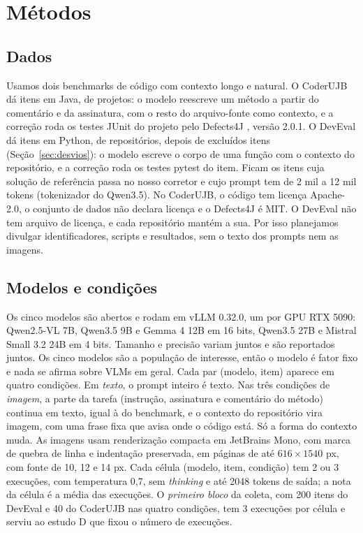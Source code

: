 \section{Métodos}

\subsection{Dados}
Usamos dois benchmarks de código com contexto longo e natural. O CoderUJB \citep{zeng2024coderujb} dá \nItemsUjb itens em Java, de \nClustersUjb projetos: o modelo reescreve um método a partir do comentário e da assinatura, com o resto do arquivo-fonte como contexto, e a correção roda os testes JUnit do projeto pelo Defects4J \citep{just2014defects4j}, versão 2.0.1. O DevEval \citep{li2024deveval} dá \nItemsDev itens em Python, de \nClustersDev repositórios, depois de excluídos \excludedDev itens (Seção~\ref{sec:desvios}): o modelo escreve o corpo de uma função com o contexto do repositório, e a correção roda os testes pytest do item. Ficam os itens cuja solução de referência passa no nosso corretor e cujo prompt tem de 2 mil a 12 mil tokens (tokenizador do Qwen3.5). No CoderUJB, o código tem licença Apache-2.0, o conjunto de dados não declara licença e o Defects4J é MIT. O DevEval não tem arquivo de licença, e cada repositório mantém a sua. Por isso planejamos divulgar identificadores, scripts e resultados, sem o texto dos prompts nem as imagens.

\subsection{Modelos e condições}
Os cinco modelos são abertos e rodam em vLLM \citep{kwon2023vllm} 0.32.0, um por GPU RTX 5090: Qwen2.5-VL 7B, Qwen3.5 9B e Gemma 4 12B em 16 bits, Qwen3.5 27B e Mistral Small 3.2 24B em 4 bits. Tamanho e precisão variam juntos e são reportados juntos. Os cinco modelos são a população de interesse, então o modelo é fator fixo e nada se afirma sobre VLMs em geral. Cada par (modelo, item) aparece em quatro condições. Em \emph{texto}, o prompt inteiro é texto. Nas três condições de \emph{imagem}, a parte da tarefa (instrução, assinatura e comentário do método) continua em texto, igual à do benchmark, e o contexto do repositório vira imagem, com uma frase fixa que avisa onde o código está. Só a forma do contexto muda. As imagens usam renderização compacta em JetBrains Mono, com marca de quebra de linha e indentação preservada, em páginas de até $616 \times 1540$ px, com fonte de 10, 12 e 14 px. Cada célula (modelo, item, condição) tem 2 ou 3 execuções, com temperatura 0,7, sem \emph{thinking} e até 2048 tokens de saída; a nota da célula é a média das execuções. O \emph{primeiro bloco} da coleta, com 200 itens do DevEval e 40 do CoderUJB nas quatro condições, tem 3 execuções por célula e serviu ao estudo D que fixou o número de execuções.

